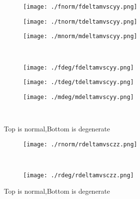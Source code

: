 \documentclass[aps,floats,floatfix,nofootinbib]{revtex4-1}
\begin{document}
\begin{center}
\begin{figure}
\begin{subfigure}{0.3\textwidth}
\texttt{[image: ./fnorm/fdeltamvscyy.png]}
\label{}
\end{subfigure}
\begin{subfigure}{0.3\textwidth}
\texttt{[image: ./tnorm/tdeltamvscyy.png]}
\label{}
\end{subfigure}
\begin{subfigure}{0.3\textwidth}
\texttt{[image: ./mnorm/mdeltamvscyy.png]}
\label{}
\end{subfigure}\\
\begin{subfigure}{0.3\textwidth}
\texttt{[image: ./fdeg/fdeltamvscyy.png]}
\label{}
\end{subfigure}
\begin{subfigure}{0.3\textwidth}
\texttt{[image: ./tdeg/tdeltamvscyy.png]}
\label{}
\end{subfigure}
\begin{subfigure}{0.3\textwidth}
\texttt{[image: ./mdeg/mdeltamvscyy.png]}
\label{}
\end{subfigure}\\
\caption{Top is normal,Bottom is degenerate}
\end{figure}
\end{center}

\begin{center}
\begin{figure}
\begin{subfigure}{0.95\textwidth}
\texttt{[image: ./rnorm/rdeltamvsczz.png]}
\label{}
\end{subfigure}\\
\begin{subfigure}{0.95\textwidth}
\texttt{[image: ./rdeg/rdeltamvsczz.png]}
\label{}
\end{subfigure}
\caption{Top is normal,Bottom is degenerate}
\end{figure}
\end{center}
\end{document}
